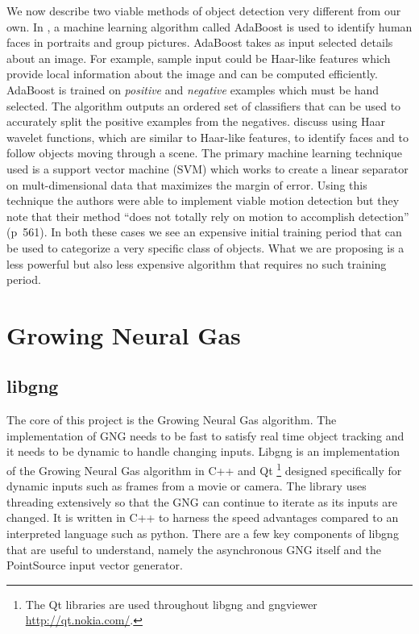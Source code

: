 \documentclass{article}
\renewcommand{\|}{\origbar} %
\begin{document}
We now describe two viable methods of object detection very different from our own. In , a machine learning algorithm called AdaBoost is used to identify human faces in portraits and group pictures. AdaBoost takes as input selected details about an image. For example, sample input could be Haar-like features which provide local information about the image and can be computed efficiently. AdaBoost is trained on {\em positive} and {\em negative} examples which must be hand selected. The algorithm outputs an ordered set of classifiers that can be used to accurately split the positive examples from the negatives.  discuss using Haar wavelet functions, which are similar to Haar-like features, to identify faces and to follow objects moving through a scene. The primary machine learning technique used is a support vector machine (SVM) which works to create a linear separator on mult-dimensional data that maximizes the margin of error. Using this technique the authors were able to implement viable motion detection but they note that their method ``does not totally rely on motion to accomplish detection'' (p~561). In both these cases we see an expensive initial training period that can be used to categorize a very specific class of objects. What we are proposing is a less powerful but also less expensive algorithm that requires no such training period.

\section{Growing Neural Gas}
\label{sec:GNG}

\subsection{libgng}

The core of this project is the Growing Neural Gas algorithm. The implementation of GNG needs to be fast to satisfy real time object tracking and it needs to be dynamic to handle changing inputs. Libgng is an implementation of the Growing Neural Gas algorithm in C++ and Qt \footnote{The Qt libraries are used throughout libgng and gngviewer \url{http://qt.nokia.com/}.} designed specifically for dynamic inputs such as frames from a movie or camera. The library uses threading extensively so that the GNG can continue to iterate as its inputs are changed. It is written in C++ to harness the speed advantages compared to an interpreted language such as python. There are a few key components of libgng that are useful to understand, namely the asynchronous GNG itself and the PointSource input vector generator.
\end{document}
